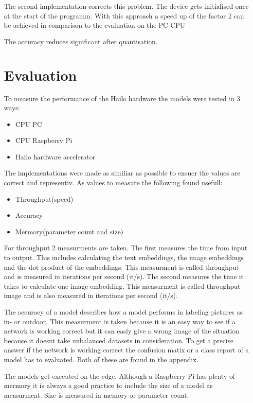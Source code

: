 The second implementation corrects this problem.
The device gets initialised once at the start of the programm.
With this approach a speed up of the factor 2 can be achieved in comparison to the evaluation on the PC CPU



The accuracy reduces significant after quantisation. 

\section{Evaluation}

To measure the performance of the Hailo hardware the models were tested in 3 ways:
\begin{itemize}
    \item CPU PC
    \item CPU Raspberry Pi
    \item Hailo hardware accelerator
\end{itemize}
The implementations were made as similiar as possible to ensuer the values are correct and representiv. 
As values to measure the following found usefull:
\begin{itemize}
    \item Throughput(speed)
    \item Accuracy
    \item Mermory(parameter count and size) 
\end{itemize}

For throughput 2 measurments are taken.
The first measures the time from input to output.
This includes calculating the text embeddings, the image embeddings and the dot product of the embeddings.
This measurment is called throughput and is measured in iterations per second (it/s).
The second measures the time it takes to calculate one image embedding.
This measurment is called throughput image and is also measured in iterations per second (it/s).

The accuracy of a model describes how a model performs in labeling pictures as in- or outdoor.
This measurment is taken because it is an easy way to see if a network is working correct but it can easly give a wrong image of the situation because it doesnt take unbalanced datasets in consideration.
To get a precise answer if the network is working correct the confusion matix or a class report of a model has to evaluated.
Both of these are found in the appendix.

The models get executed on the edge.
Although a Raspberry Pi has plenty of mermory it is always a good practice to include the size of a model as measurment.
Size is measured in memory or parameter count.


